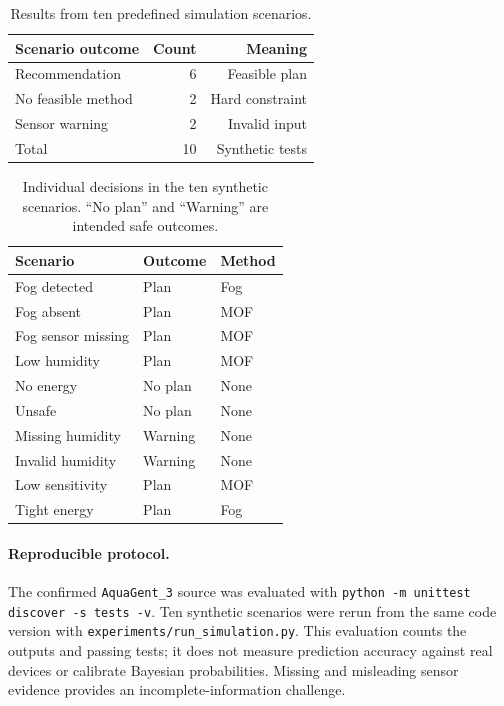 \documentclass[11pt,a4paper]{article}
\begin{document}
\begin{table}[H]
\centering
\footnotesize
\setlength{\tabcolsep}{3pt}
\begin{tabular}{lrr}
\toprule
Scenario outcome & Count & Meaning\\
\midrule
Recommendation & 6 & Feasible plan\\
No feasible method & 2 & Hard constraint\\
Sensor warning & 2 & Invalid input\\
\midrule
Total & 10 & Synthetic tests\\
\bottomrule
\end{tabular}
\caption{Results from ten predefined simulation scenarios.}
\label{tab:scenarios}
\end{table}
\begin{table}[H]
\centering
\footnotesize
\begin{tabular}{lll}
\toprule
Scenario & Outcome & Method \\
\midrule
Fog detected & Plan & Fog \\
Fog absent & Plan & MOF \\
Fog sensor missing & Plan & MOF \\
Low humidity & Plan & MOF \\
No energy & No plan & None \\
Unsafe & No plan & None \\
Missing humidity & Warning & None \\
Invalid humidity & Warning & None \\
Low sensitivity & Plan & MOF \\
Tight energy & Plan & Fog \\
\bottomrule
\end{tabular}
\caption{Individual decisions in the ten synthetic scenarios. ``No plan'' and ``Warning'' are intended safe outcomes.}
\label{tab:allscenarios}
\end{table}
\clearpage
\paragraph{Reproducible protocol.}
The confirmed \texttt{AquaGent\_3} source was evaluated with \texttt{python -m unittest discover -s tests -v}. Ten synthetic scenarios were rerun from the same code version with \texttt{experiments/run\_simulation.py}. This evaluation counts the outputs and passing tests; it does not measure prediction accuracy against real devices or calibrate Bayesian probabilities. Missing and misleading sensor evidence provides an incomplete-information challenge.
\end{document}
